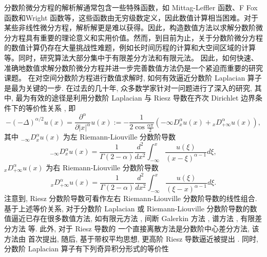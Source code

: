 分数阶微分方程的解析解通常包含一些特殊函数，如 Mittag-Leffler 函数、F Fox 函数和Wright 函数等，这些函数由无穷级数定义，因此数值计算相当困难。对于某些非线性微分方程，解析解更是难以获得。因此，构造数值方法以求解分数阶微分方程具有重要的理论意义和实用价值。然而，到目前为止，关于分数阶微分方程的数值计算仍存在大量挑战性难题，例如长时间历程的计算和大空间区域的计算等。同时，研究算法大部分集中于有限差分方法和有限元法。
因此，如何快速、准确地数值求解分数阶微分方程并进一步完善数值方法仍是一个紧迫而重要的研究课题。
在对空间分数阶方程进行数值求解时, 如何有效逼近分数阶 Laplacian 算子是最为关键的一步. 在过去的几十年, 众多数学家针对一问题进行了深入的研究, 其中, 最为有效的途径是利用分数阶 Laplacian 与 Riesz 导数在齐次 Dirichlet 边界条件下的等价性关系 \cite{yangNumericalMethodsFractional2010,demengelFunctionalSpacesTheory2012}, 即
\begin{equation}
-(-\Delta)^{\alpha / 2} u(x)=\frac{\partial^\alpha}{\partial|x|^\alpha} u(x):=-\frac{1}{2 \cos \frac{\alpha \pi}{2}}\left(-\infty D_x^\alpha u(x)+{ }_x D_{+\infty}^\alpha u(x)\right),
\end{equation}
其中 ${ }_{-\infty} D_x^\alpha u(x)$ 为左 Riemann-Liouville 分数阶导数
\begin{equation}
{ }_{-\infty} D_x^\alpha u(x)=\frac{1}{\Gamma(2-\alpha)} \frac{d^2}{d x^2} \int_{-\infty}^x \frac{u(\xi)}{(x-\xi)^{\alpha-1}} d \xi,
\end{equation}
${ }_x D_{+\infty}^\alpha u(x)$ 为右 Riemann-Liouville 分数阶导数
\begin{equation}
{ }_x D_{+\infty}^\alpha u(x)=\frac{1}{\Gamma(2-\alpha)} \frac{d^2}{d x^2} \int_{-\infty}^x \frac{u(\xi)}{(\xi-x)^{\alpha-1}} d \xi .
\end{equation}
注意到, Riesz 分数阶导数可看作左右 Riemann-Liouville 分数阶导数的线性组合.
基于上述等价关系, 对于分数阶 Laplacian 或 Riemann-Liouville 分数阶导数的数值逼近已存在很多数值方法, 如有限元方法 \cite{dengFiniteElementMethod2009,ervinNumericalApproximationTime2007}, 间断 Galerkin 方法 \cite{xuDiscontinuousGalerkinMethod2014}, 谱方法 \cite{zayernouriFractionalSpectralCollocation2014,zengCrankNicolsonADI2014}, 有限差分方法 \cite{chenFourthOrderAccurate2014,meerschaertFiniteDifferenceApproximations2004} 等. 
此外, 对于 Riesz 导数的 一个直接离散方法是分数阶中心差分方法, 该方法由 \cite{duAnalysisApproximationNonlocal2012} 首次提出, 随后, 基于带权平均思想, 更高阶 Riesz 导数逼近被提出 \cite{dingHighorderAlgorithmsRiesz2015,zhangFourthOrderCompactDifference2014}.
同时, 分数阶 Laplacian 算子有下列奇异积分形式的等价性 \cite{duAnalysisApproximationNonlocal2012}
